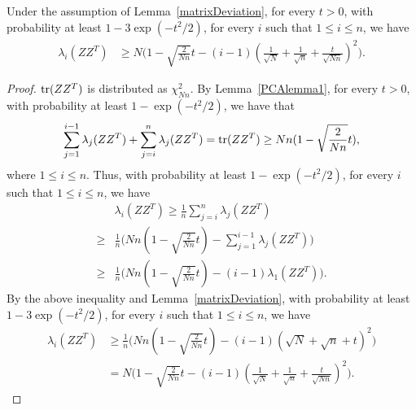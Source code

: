\begin{lemma}\label{PCAlemma2}
    Under the assumption of Lemma~\ref{matrixDeviation}, for every $t> 0$, with probability at least $1-3\exp(-t^2/2)$, for every $i$ such that $1\leq i \leq n$, we have
\begin{equation*}
    \begin{split}
        \lambda_{i}(ZZ^T)
        &\geq
        N \Big( 1-\sqrt{\frac{2}{Nn}}t-(i-1)(\frac{1}{\sqrt{N}}+\frac{1}{\sqrt{n}}+\frac{t}{\sqrt{Nn}})^2 \Big).
    \end{split}
\end{equation*}

\end{lemma}
\begin{proof}
    $\operatorname{tr} (ZZ^T)$ is distributed as $\chi^2_{Nn}$. By Lemma~\ref{PCAlemma1}, for every $t>0$, with probability at least $1-\exp(-t^2/2)$, we have that
    $$
    \sum_{j=1}^{i-1}\lambda_j (ZZ^T) + \sum_{j=i}^{n}\lambda_j (ZZ^T)=\operatorname{tr} (ZZ^T)\geq Nn(1-\sqrt{\frac{2}{Nn}}t),
    $$
    where $1\leq i \leq n$.
    Thus, with probability at least $1-\exp(-t^2/2)$, for every $i$ such that $1\leq i \leq n$, we have
\begin{equation*}
    \begin{split}
        &\lambda_{i}(ZZ^T)\geq \frac{1}{n}\sum_{j=i}^{n}\lambda_j (ZZ^T)\\
        \geq &
        \frac{1}{n} \Big( Nn(1-\sqrt{\frac{2}{Nn}}t)-\sum_{j=1}^{i-1}\lambda_j (ZZ^T)  \Big)\\
        \geq &
        \frac{1}{n} \Big( Nn(1-\sqrt{\frac{2}{Nn}}t)-(i-1)\lambda_1 (ZZ^T)  \Big).
    \end{split}
\end{equation*}
    By the above inequality and Lemma~\ref{matrixDeviation}, with probability at least $1-3\exp(-t^2/2)$, for every $i$ such that $1\leq i \leq n$, we have
\begin{equation*}
    \begin{split}
        \lambda_{i}(ZZ^T)
        &\geq
        \frac{1}{n} \Big( Nn(1-\sqrt{\frac{2}{Nn}}t)-(i-1)(\sqrt{N}+\sqrt{n}+t)^2 \Big)\\
        &=
        N \Big( 1-\sqrt{\frac{2}{Nn}}t-(i-1)(\frac{1}{\sqrt{N}}+\frac{1}{\sqrt{n}}+\frac{t}{\sqrt{Nn}})^2 \Big).
    \end{split}
\end{equation*}
\end{proof}

